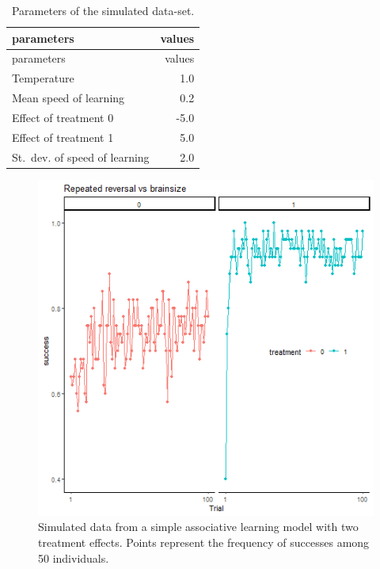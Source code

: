 \documentclass[
]{article}
\begin{document}
\begin{longtable}[]{@{}lr@{}}
\caption{\label{tab:param_simple} Parameters of the simulated
data-set.}\tabularnewline
\toprule\noalign{}
parameters & values \\
\midrule\noalign{}
\endfirsthead
\toprule\noalign{}
parameters & values \\
\midrule\noalign{}
\endhead
\bottomrule\noalign{}
\endlastfoot
Temperature & 1.0 \\
Mean speed of learning & 0.2 \\
Effect of treatment 0 & -5.0 \\
Effect of treatment 1 & 5.0 \\
St.~dev. of speed of learning & 2.0 \\
\end{longtable}

\begin{figure}

\includegraphics{simple_DS} \hfill{}

\caption{Simulated data from a simple associative learning model with two treatment effects. Points represent the frequency of successes among 50 individuals.}\label{fig:simple_dataset}
\end{figure}
\end{document}
